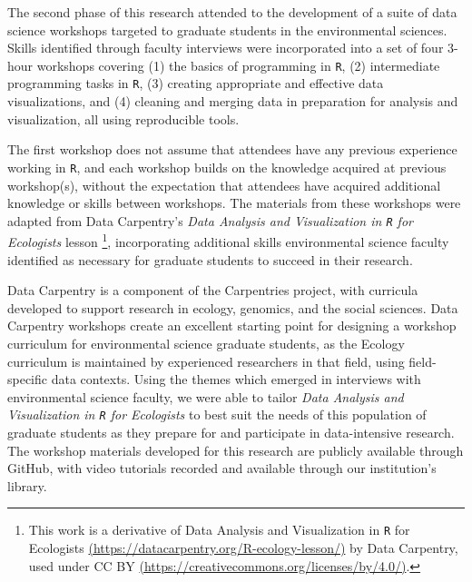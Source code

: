 \documentclass[12pt]{article}
\begin{document}
\quad The second phase of this research attended to the  development of a suite of data science workshops targeted to graduate students in the environmental sciences. Skills identified through faculty interviews were incorporated into a set of four 3-hour workshops covering (1) the basics of programming in \texttt{R}, (2) intermediate programming tasks in \texttt{R}, (3) creating appropriate and effective data visualizations, and (4) cleaning and merging data in preparation for analysis and visualization, all using reproducible tools. 

\quad The first workshop does not assume that attendees have any previous experience working in \texttt{R}, and each workshop builds on the knowledge acquired at previous workshop(s), without the expectation that attendees have acquired additional knowledge or skills between workshops. The materials from these workshops were adapted from Data Carpentry's \emph{Data Analysis and Visualization in \texttt{R} for Ecologists} lesson \citep{ecology_curriculum} \footnote{This work is a derivative of Data Analysis and Visualization in \texttt{R} for Ecologists \href{https://datacarpentry.org/R-ecology-lesson/}{(https://datacarpentry.org/R-ecology-lesson/)} by Data Carpentry, used under CC BY \href{https://creativecommons.org/licenses/by/4.0/}{(https://creativecommons.org/licenses/by/4.0/)}.}, incorporating additional skills environmental science faculty identified as necessary for graduate students to succeed in their research.   


\quad Data Carpentry is a component of the Carpentries project, with curricula developed to support research in ecology, genomics, and the social sciences. Data Carpentry workshops create an excellent starting point for designing a workshop curriculum for environmental science graduate students, as the Ecology curriculum is maintained by experienced researchers in that field, using field-specific data contexts. Using the themes which emerged in interviews with environmental science faculty, we were able to tailor \emph{Data Analysis and Visualization in \texttt{R} for Ecologists} to best suit the needs of this population of graduate students as they prepare for and participate in data-intensive research. The workshop materials developed for this research are publicly available through GitHub, 
with video tutorials recorded and available through our institution's library.   %
\end{document}
